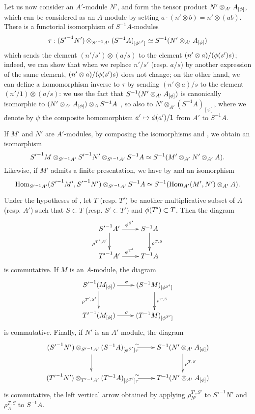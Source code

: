 \begin{env}[1.5.4]
\label{0.1.5.4}
Let us now consider an $A'$-module $N'$, and form the tensor product
$N'\otimes_{A'}A_{[\phi]}$, which can be considered as an $A$-module by setting
$a\cdot(n'\otimes b)=n'\otimes(ab)$. There is a functorial isomorphism of
$S^{-1}A$-modules
\[
  \tau:({S'}^{-1}N')\otimes_{{S'}^{-1}A'}(S^{-1}A)_{[\phi^{S'}]}
  \simeq S^{-1}(N'\otimes_{A'}A_{[\phi]})
\]
which
sends the element $(n'/s')\otimes(a/s)$ to the element
$(n'\otimes a)/(\phi(s')s)$; indeed, we can show that when we replace
$n'/s'$ (resp. $a/s$) by another expression of the same element,
$(n'\otimes a)/(\phi(s')s)$ does not change; on the other hand, we can define
a homomorphism inverse to $\tau$ by sending $(n'\otimes a)/s$ to the element
$(n'/1)\otimes(a/s)$: we use the fact that $S^{-1}(N'\otimes_{A'}A_{[\phi]})$
is canonically isomorphic to $(N'\otimes_{A'}A_{[\phi]})\otimes_A S^{-1}A$
, so also to $N'\otimes_{A'}(S^{-1}A)_{[\psi]}$, where we
denote by $\psi$ the composite homomorphism $a'\mapsto\vphi(a')/1$ from $A'$ to
$S^{-1}A$.
\end{env}

\begin{env}[1.5.5]
\label{0.1.5.5}
If $M'$ and $N'$ are $A'$-modules, by composing the isomorphisms
 and , we obtain an isomorphism
\[
  {S'}^{-1}M\otimes_{{S'}^{-1}A'}{S'}^{-1}N'\otimes_{{S'}^{-1}A'}S^{-1}A
  \simeq S^{-1}(M'\otimes_{A'}N'\otimes_{A'}A).
\]
Likewise, if $M'$ admits a finite presentation, we have by  and
 an isomorphism
\[
  {\mathop{\mathrm{Hom}}\nolimits}_{{S'}^{-1}A'}({S'}^{-1}M',{S'}^{-1}N')\otimes_{{S'}^{-1}A'}S^{-1}A
  \simeq S^{-1}({\mathop{\mathrm{Hom}}\nolimits}_{A'}(M',N')\otimes_{A'}A).
\]
\end{env}

\begin{env}[1.5.6]
\label{0.1.5.6}
Under the hypotheses of , let $T$ (resp. $T'$) be another
multiplicative subset of $A$ (resp. $A'$) such that $S\subset T$
(resp. $S'\subset T'$) and $\phi(T')\subset T$. Then the diagram
\[
  \xymatrix{
    {S'}^{-1}A'\ar[r]^{\vphi^{S'}}\ar[d]_{\rho^{T',S'}} &
    S^{-1}A\ar[d]^{\rho^{T,S}}\\
    {T'}^{-1}A'\ar[r]^{\vphi^{T'}} &
    T^{-1}A
  }
\]
is commutative. If $M$ is an $A$-module, the diagram
\[
  \xymatrix{
    {S'}^{-1}(M_{[\vphi]})\ar[r]^\sigma\ar[d]_{\rho^{T',S'}} &
    (S^{-1}M)_{[\vphi^{S'}]}\ar[d]^{\rho^{T,S}}\\
    {T'}^{-1}(M_{[\vphi]})\ar[r]^\sigma &
    (T^{-1}M)_{[\vphi^{T'}]}
  }
\]
is commutative. Finally, if $N'$ is an $A'$-module, the diagram
\[
  \xymatrix{
    ({S'}^{-1}N')\otimes_{{S'}^{-1}A'}(S^{-1}A)_{[\vphi^{S'}]}
      \ar[r]^\sim_\tau\ar[d] &
    S^{-1}(N'\otimes_{A'}A_{[\vphi]})\ar[d]^{\rho^{T,S}}\\
    ({T'}^{-1}N')\otimes_{{T'}^{-1}A'}(T^{-1}A)_{[\vphi^{T'}]}
      \ar[r]^\sim_\tau &
    T^{-1}(N'\otimes_{A'}A_{[\vphi]})
  }
\]
is commutative, the left vertical arrow obtained by applying
$\rho_{N'}^{T',S'}$ to ${S'}^{-1}N'$ and $\rho_A^{T,S}$ to $S^{-1}A$.
\end{env}

